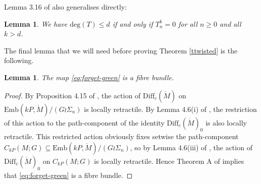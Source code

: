 \documentclass[reqno,a4paper]{article}
\numberwithin{equation}{section}
\theoremstyle{italicised}
\newtheorem{lem}[thm]{Lemma}
\theoremstyle{upright}
\theoremstyle{italicised-restate}
\renewcommand{\geq}{\geqslant}
\renewcommand{\leq}{\leqslant}
\begin{document}
Lemma 3.16 of \cite{Palmer2018Twistedhomologicalstability} also generalises directly:

\begin{lem}\label{l:degree-height}
We have $\mathrm{deg}(T) \leq d$ if and only if $T_n^k = 0$ for all $n \geq 0$ and all $k > d$.
\end{lem}

The final lemma that we will need before proving Theorem \ref{ttwisted} is the following.

\begin{lem}\label{l:forget-fibre-bundle}
The map \eqref{eq:forget-green} is a fibre bundle.
\end{lem}
\begin{proof}
By Proposition 4.15 of \cite{Palmer2018HomologicalstabilitymoduliI}, the action of $\mathrm{Diff}_c(\mathring{M})$ on $\mathrm{Emb}(kP,\mathring{M})/(G \wr \Sigma_n)$ is locally retractile. By Lemma 4.6(i) of \cite{Palmer2018HomologicalstabilitymoduliI}, the restriction of this action to the path-component of the identity $\mathrm{Diff}_c(\mathring{M})_0$ is also locally retractile. This restricted action obviously fixes setwise the path-component $C_{kP}(M;G) \subseteq \mathrm{Emb}(kP,\mathring{M})/(G \wr \Sigma_n)$, so by Lemma 4.6(iii) of \cite{Palmer2018HomologicalstabilitymoduliI}, the action of $\mathrm{Diff}_c(\mathring{M})_0$ on $C_{kP}(M;G)$ is locally retractile. Hence Theorem A of \cite{Palais1960Localtrivialityof} implies that \eqref{eq:forget-green} is a fibre bundle.
\end{proof}
\end{document}
